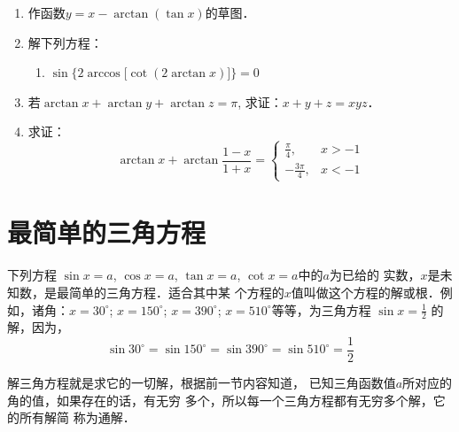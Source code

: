 \begin{enumerate}
\begin{enumerate}
若$x<0$, 那么$\arccot x=\pi+\arctan\frac{1}{x}$

\item 若$x\ge 0$，$\frac{1}{2}\arccos(2x^2-1)=\arccos x$
\item 若$x\ge 1$，$2\arctan x+\arcsin\frac{2x}{1+x^2}=\pi$
\end{enumerate}

\item 作函数$y=x-\arctan(\tan x)$的草图．

\item 解下列方程：
\begin{enumerate}
    \item $\sin\Big\{2\arccos\big[\cot(2\arctan x)\big]\Big\}=0$
\end{enumerate}

\item 若$\arctan x+\arctan y+ \arctan z=\pi$, 
求证：$x+y+z=xyz$．

\item 求证：
\[\arctan x+\arctan\frac{1-x}{1+x}=\begin{cases}
    \frac{\pi}{4},& x>-1\\
    -\frac{3\pi}{4},& x<-1
\end{cases}\]
\end{enumerate}

\section{最简单的三角方程}
下列方程
$\sin x=a$, $\cos x=a$, $\tan x=a$, $\cot x=a$中的$a$为已给的
实数，$x$是未知数，是最简单的三角方程．适合其中某
个方程的$x$值叫做这个方程的解或根．例如，诸角：$x=
30^{\circ}$; $x=150^{\circ}$; $x=390^{\circ}$; $x=510^{\circ}$等等，为三角方程
$\sin x=\frac{1}{2}$
的解，因为，\[\sin30^{\circ}=\sin150^{\circ}=\sin390^{\circ}=\sin510^{\circ}=\frac{1}{2}\]

解三角方程就是求它的一切解，根据前一节内容知道，
已知三角函数值$a$所对应的角的值，如果存在的话，有无穷
多个，所以每一个三角方程都有无穷多个解，它的所有解简
称为通解．

